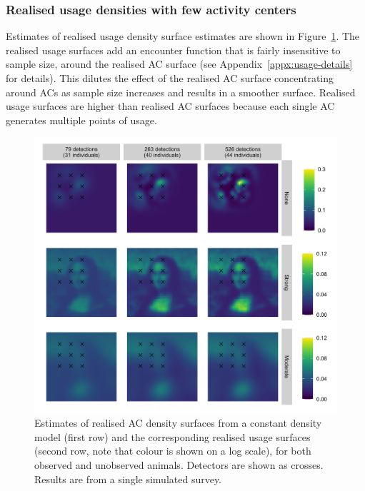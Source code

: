 \documentclass[10pt,a4paper]{article}
\begin{document}
\subsubsection{Realised usage densities with few activity centers}

Estimates of realised usage density surface estimates are shown in Figure~\ref{move}. The realised usage surfaces add an encounter function that is fairly insensitive to sample size, around the realised AC surface (see Appendix~\ref{appx:usage-details} for details). This dilutes the effect of the realised AC surface concentrating around ACs as sample size increases and results in a smoother surface. Realised usage surfaces are higher than realised AC surfaces because each single AC generates multiple points of usage.


\begin{figure}[htbp]
\centering
\includegraphics[width=1\textwidth]{mona_with_movement.png}
\caption{Estimates of realised AC density surfaces from a constant density model (first row) and the corresponding realised usage surfaces (second row, note that colour is shown on a log scale), for both observed and unobserved animals. Detectors are shown as crosses. Results are from a single simulated survey.}
\label{move}
\end{figure}
\end{document}
